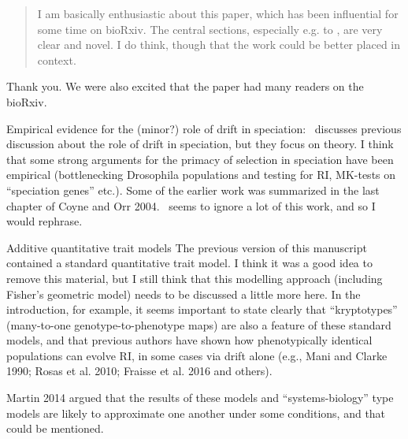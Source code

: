 \begin{quote}
  I am basically enthusiastic about this paper, which has been influential for some time on bioRxiv. The central sections, especially e.g.  to , are very clear and novel. I do think, though that the work could be better placed in context.
\end{quote}

Thank you. We were also excited that the paper had many readers on the bioRxiv. 

\begin{point}{Empirical evidence for the (minor?) role of drift in speciation:}
%
    \revref~discusses previous discussion about the role of drift in speciation, but they focus on theory. I think that some strong arguments for the primacy of selection in speciation have been empirical (bottlenecking Drosophila populations and testing for RI, MK-tests on ``speciation genes'' etc.). Some of the earlier work was summarized in the last chapter of Coyne and Orr 2004. ~seems to ignore a lot of this work, and so I would rephrase.
\end{point}


\begin{point}{Additive quantitative trait models}
%
The previous version of this manuscript contained a standard quantitative trait model. I think it was a good idea to remove this material, but I still think that this modelling approach (including Fisher’s geometric model) needs to be discussed a little more here. In the introduction, for example, it seems important to state clearly that ``kryptotypes'' (many-to-one genotype-to-phenotype maps) are also a feature of these standard models, and that previous authors have shown how phenotypically identical populations can evolve RI, in some cases via drift alone (e.g., Mani and Clarke 1990; Rosas et al. 2010; Fraisse et al. 2016 and others).

Martin 2014 argued that the results of these models and ``systems-biology'' type models are likely to approximate one another under some conditions, and that could be mentioned.
\end{point}


